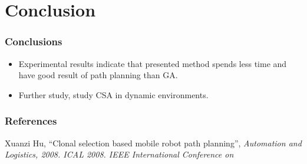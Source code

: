 \section{Conclusion}

\frame
{
\frametitle{Conclusions}
\begin{itemize}
	\item Experimental results indicate that presented method spends less time and have good result of path planning than GA.
	\item Further study, study CSA in dynamic environments.
\end{itemize}
}

\frame
{
\frametitle{References}
Xuanzi Hu, ``Clonal selection based mobile robot path planning'',  \emph{Automation and Logistics, 2008. ICAL 2008. IEEE International Conference on}
}
